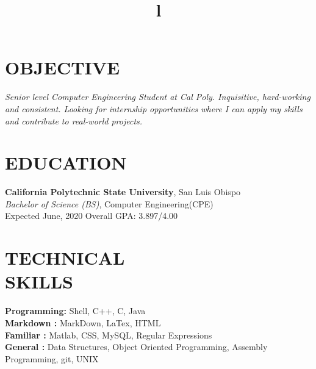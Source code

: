 \documentclass[margin]{res}
\begin{document}
\begin{resume}

\section{OBJECTIVE}
{\sl Senior level Computer Engineering Student at Cal Poly. Inquisitive, hard-working and consistent. Looking for internship opportunities where I can apply my skills and contribute to real-world projects.}

\section{EDUCATION}

\textbf{California Polytechnic State University}, San Luis Obispo\\
{\sl Bachelor of Science (BS)}, Computer Engineering(CPE)\\
Expected June, 2020
\hfill Overall GPA: 3.897/4.00 


\section{TECHNICAL\\SKILLS}

\textbf{Programming:} Shell, C++, C, Java
\\
\textbf{Markdown :} MarkDown, LaTex, HTML
\\
\textbf{Familiar :} Matlab, CSS, MySQL, Regular Expressions
\\
\textbf{General :} Data Structures, Object Oriented Programming, Assembly Programming, git, UNIX

\begin{format}
\title{l}\\
\\
\body\\
\end{format}





\end{resume}
\end{document}
